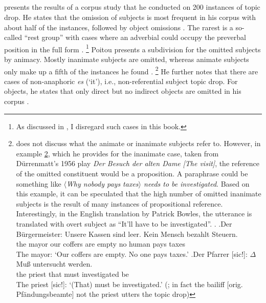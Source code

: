 \largerpage
{}
\subsection{\citet{poitou1993}}
\citet{poitou1993} presents the results of a corpus study that he conducted on 200 instances of topic drop.
He states that the omission of subjects is most frequent in his corpus with about half of the instances, followed by object omissions \citep[119]{poitou1993}.
The rarest is a so-called ``rest group'' with cases where an adverbial  could occupy the preverbal position in the full form \citep[117]{poitou1993}.%
\footnote{As discussed in , I disregard such cases in this book.}
%
Poitou presents a subdivision for the omitted subjects by animacy. 
Mostly inanimate subjects are omitted, whereas animate subjects only make up a fifth of the instances he found \citep[116]{poitou1993}.%
\footnote{\citet{poitou1993} does not discuss what the animate  or inanimate subjects refer to.
However, in example \ref{ex:duerrenmatt}, which he provides for the inanimate case, taken from Dürrenmatt's 1956 play \textit{Der Besuch der alten Dame} \textit{[The visit]}, the reference of the omitted constituent would be a proposition.
A paraphrase could be something like \textit{$\langle$Why nobody pays taxes$\rangle$ needs to be investigated}.
Based on this example, it can be speculated that the high number of omitted inanimate subjects is the result of many instances of propositional reference.
Interestingly, in the English translation by Patrick Bowles, the utterance is translated with overt subject as ``It'll have to be investigated''.
\ex.\label{ex:duerrenmatt}
\ag.Der Bürgermeister: Unsere Kassen sind leer. Kein Mensch bezahlt Steuern.\\
the mayor our coffers are empty no human pays taxes\\
The mayor: `Our coffers are empty. No one pays taxes.'
\bg.Der {Pfarrer [sic!]:} $\Delta$ Muß untersucht werden.\\
the priest that must investigated be\\
The priest [sic!]: `(That) must be investigated.' (\cite[116]{poitou1993}; in fact the bailiff [orig. Pfändungsbeamte] not the priest utters the topic drop)
\vspace{-0.75\baselineskip}
}
He further notes that there are cases of non-anaphoric \textit{es} (`it'), i.e., non-referential subject topic drop.
For objects, he states that only direct but no indirect objects are omitted in his corpus \citep[116, footnote 1]{poitou1993}.

